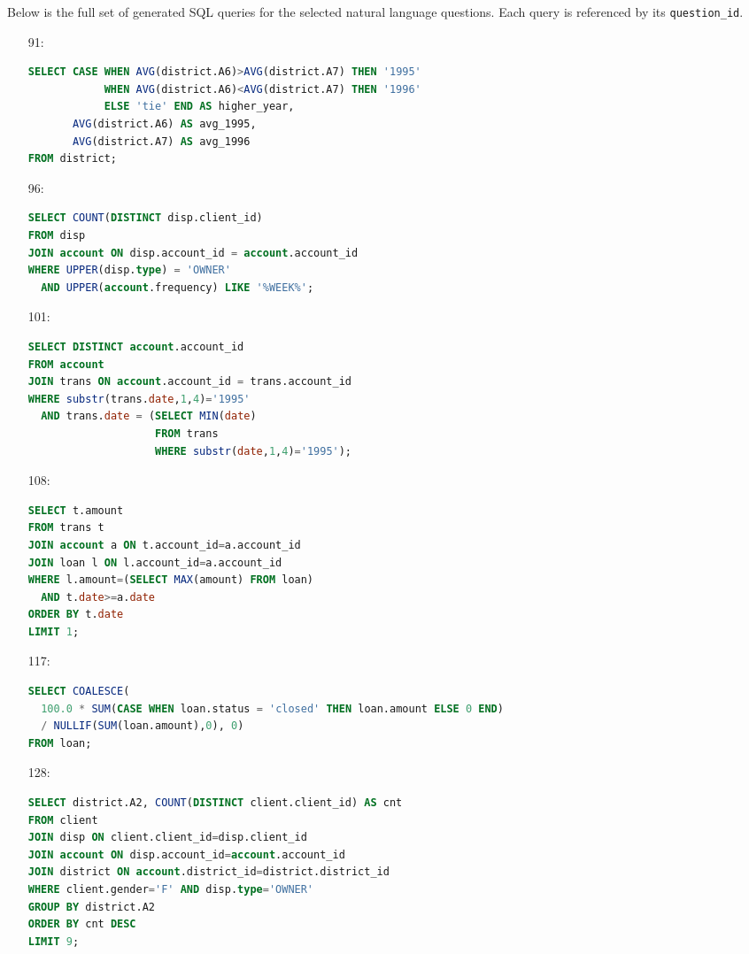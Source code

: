 \documentclass[11pt]{article}
\begin{document}
Below is the full set of generated SQL queries for the selected natural language questions. Each query is referenced by its \texttt{question\_id}.

\begin{enumerate}

\item[91:]
\begin{lstlisting}[language=SQL]
SELECT CASE WHEN AVG(district.A6)>AVG(district.A7) THEN '1995'
            WHEN AVG(district.A6)<AVG(district.A7) THEN '1996'
            ELSE 'tie' END AS higher_year,
       AVG(district.A6) AS avg_1995,
       AVG(district.A7) AS avg_1996
FROM district;
\end{lstlisting}

\item[96:]
\begin{lstlisting}[language=SQL]
SELECT COUNT(DISTINCT disp.client_id)
FROM disp
JOIN account ON disp.account_id = account.account_id
WHERE UPPER(disp.type) = 'OWNER'
  AND UPPER(account.frequency) LIKE '%WEEK%';
\end{lstlisting}

\item[101:]
\begin{lstlisting}[language=SQL]
SELECT DISTINCT account.account_id
FROM account
JOIN trans ON account.account_id = trans.account_id
WHERE substr(trans.date,1,4)='1995'
  AND trans.date = (SELECT MIN(date)
                    FROM trans
                    WHERE substr(date,1,4)='1995');
\end{lstlisting}

\item[108:]
\begin{lstlisting}[language=SQL]
SELECT t.amount
FROM trans t
JOIN account a ON t.account_id=a.account_id
JOIN loan l ON l.account_id=a.account_id
WHERE l.amount=(SELECT MAX(amount) FROM loan)
  AND t.date>=a.date
ORDER BY t.date
LIMIT 1;
\end{lstlisting}

\item[117:]
\begin{lstlisting}[language=SQL]
SELECT COALESCE(
  100.0 * SUM(CASE WHEN loan.status = 'closed' THEN loan.amount ELSE 0 END) 
  / NULLIF(SUM(loan.amount),0), 0)
FROM loan;
\end{lstlisting}

\item[128:]
\begin{lstlisting}[language=SQL]
SELECT district.A2, COUNT(DISTINCT client.client_id) AS cnt
FROM client
JOIN disp ON client.client_id=disp.client_id
JOIN account ON disp.account_id=account.account_id
JOIN district ON account.district_id=district.district_id
WHERE client.gender='F' AND disp.type='OWNER'
GROUP BY district.A2
ORDER BY cnt DESC
LIMIT 9;
\end{lstlisting}


\end{enumerate}
\end{document}
